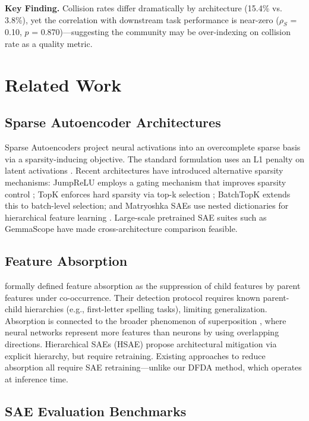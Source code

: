 \documentclass{article}
\begin{document}
\textbf{Key Finding.} Collision rates differ dramatically by architecture (15.4\% vs. 3.8\%), yet the correlation with downstream task performance is near-zero ($\rho_S$ = 0.10, $p$ = 0.870)---suggesting the community may be over-indexing on collision rate as a quality metric.

\section{Related Work}

\subsection{Sparse Autoencoder Architectures}

Sparse Autoencoders project neural activations into an overcomplete sparse basis via a sparsity-inducing objective. The standard formulation uses an L1 penalty on latent activations \citep{makhzani2014k}. Recent architectures have introduced alternative sparsity mechanisms: JumpReLU employs a gating mechanism that improves sparsity control \citep{rajamanoharan2024jumping}; TopK enforces hard sparsity via top-k selection \citep{gao2024scaling}; BatchTopK extends this to batch-level selection; and Matryoshka SAEs use nested dictionaries for hierarchical feature learning \citep{bussmann2025matryoshka}. Large-scale pretrained SAE suites such as GemmaScope \citep{lieberum2024gemmascope} have made cross-architecture comparison feasible.

\subsection{Feature Absorption}

\citet{chanin2024causal} formally defined feature absorption as the suppression of child features by parent features under co-occurrence. Their detection protocol requires known parent-child hierarchies (e.g., first-letter spelling tasks), limiting generalization. Absorption is connected to the broader phenomenon of superposition \citep{elhage2022superposition}, where neural networks represent more features than neurons by using overlapping directions. Hierarchical SAEs (HSAE) \citep{chen2025hierarchical} propose architectural mitigation via explicit hierarchy, but require retraining. Existing approaches to reduce absorption all require SAE retraining---unlike our DFDA method, which operates at inference time.

\subsection{SAE Evaluation Benchmarks}
\end{document}
